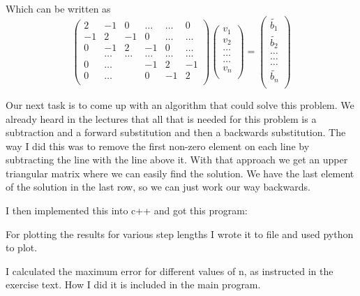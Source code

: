 \documentclass[12pt,a4wide]{article}
\begin{document}
Which can be written as
\[
  \left(\begin{array}{cccccc}
                           2& -1& 0 &\dots   & \dots &0 \\
                           -1 & 2 & -1 &0 &\dots &\dots \\
                           0&-1 &2 & -1 & 0 & \dots \\
                           & \dots   & \dots &\dots   &\dots & \dots \\
                           0&\dots   &  &-1 &2& -1 \\
                           0&\dots    &  & 0  &-1 & 2 \\
                      \end{array} \right)
\left(\begin{array}{c}
{v_1}\\
{v_2}\\
\dots \\
\dots \\ 
\dots \\
{v_n} \\
\end{array} \right) = 
\left(\begin{array}{c}
\tilde{b_1}\\
\tilde{b_2}\\
\dots \\
\dots \\ 
\dots \\
\tilde{b_n} \\
\end{array} \right)
\]

Our next task is to come up with an algorithm that could solve this problem. We already heard in the lectures that all that is needed for this problem
is a subtraction and a forward substitution and then a backwards substitution. The way I did this was to 
remove the first non-zero element on each line by subtracting the line with the line above it. With that approach we get an upper
triangular matrix where we can easily find the solution. We have the last element of the solution in the last row,
so we can just work our way backwards. 

I then implemented this into c++ and got this program:

For plotting the results for various step lengths I wrote it to file and used python to plot.


I calculated the maximum error for different values of n, as instructed in the exercise text. How I did it is included in the main program.
\end{document}
